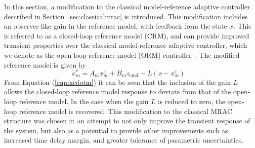 In this section, a modification to the classical model-reference adaptive controller described in Section~\ref{sec:classicalmrac} is introduced.
This modification includes an observer-like gain in the reference model, with feedback from the state $x$.
This is referred to as a closed-loop reference model (CRM), and can provide improved transient properties over the classical model-reference adaptive controller, which we denote as the open-loop reference model (ORM) controller\ \cite{gibson.aiaacrm.2012}.
The modified reference model is given by
\begin{equation}
  \label{eqn:xcdotm}
  \dot{x}_{m}^{c}=A_{m}x_{m}^{c}+B_{m}z_{\text{cmd}}-L(x-x_{m}^{c})
\end{equation}
From Equation (\ref{eqn:xcdotm}) it can be seen that the inclusion of the gain $L$ allows the closed-loop reference model response to deviate from that of the open-loop reference model.
In the case when the gain $L$ is reduced to zero, the open-loop reference model is recovered.
This modification to the classical MRAC structure was chosen in an attempt to not only improve the transient response of the system, but also as a potential to provide other improvements such as increased time delay margin, and greater tolerance of parametric uncertainties.

